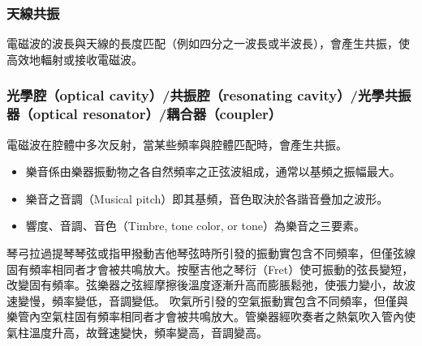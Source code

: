 \documentclass[a4paper,12pt]{report}
\begin{document}
\subsubsection{天線共振}
電磁波的波長與天線的長度匹配（例如四分之一波長或半波長），會產生共振，使高效地輻射或接收電磁波。
\subsubsection{光學腔（optical cavity）/共振腔（resonating cavity）/光學共振器（optical resonator）/耦合器（coupler）}
電磁波在腔體中多次反射，當某些頻率與腔體匹配時，會產生共振。
\begin{itemize}
\item 樂音係由樂器振動物之各自然頻率之正弦波組成，通常以基頻之振幅最大。
\item 樂音之音調（Musical pitch）即其基頻，音色取決於各諧音疊加之波形。
\item 響度、音調、音色（Timbre, tone color, or tone）為樂音之三要素。
\end{itemize}
琴弓拉過提琴琴弦或指甲撥動吉他琴弦時所引發的振動實包含不同頻率，但僅弦線固有頻率相同者才會被共鳴放大。按壓吉他之琴衍（Fret）使可振動的弦長變短，改變固有頻率。弦樂器之弦經摩擦後溫度逐漸升高而膨脹鬆弛，使張力變小，故波速變慢，頻率變低，音調變低。
吹氣所引發的空氣振動實包含不同頻率，但僅與樂管內空氣柱固有頻率相同者才會被共鳴放大。管樂器經吹奏者之熱氣吹入管內使氣柱溫度升高，故聲速變快，頻率變高，音調變高。
\end{document}
